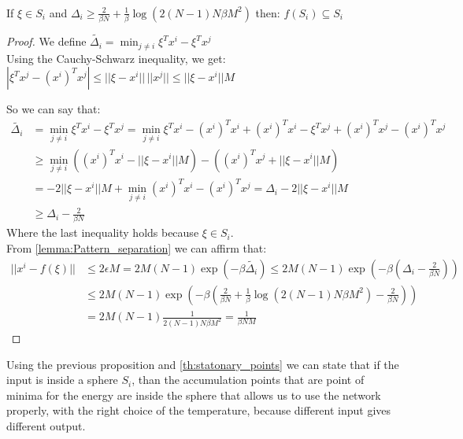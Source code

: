 \begin{proposition}\\
	\label{prop:local_conv}
	If $\xi \in S_i$ and $\Delta_i \geq \frac{2}{\beta N} + \frac{1}{\beta} \log(2(N-1)N \beta M^2)$ then: $f(S_i) \subseteq S_i$
	\begin{proof}
		We define $\widetilde{\Delta_i}= \min_{j\neq i} \xi^Tx^i - \xi^T x^j$\\
		Using the  Cauchy-Schwarz inequality, we get: $|\xi^Tx^j - (x^i)^Tx^j| \leq ||\xi - x^i||\, ||x^j|| \leq ||\xi - x^i|| M$

		\noindent So we can say that:
		\begin{align*}
			\widetilde{\Delta_i} &= \min_{j\neq i} \xi^Tx^i - \xi^T x^j =  \min_{j\neq i} \xi^Tx^i -(x^i)^Tx^i + (x^i)^Tx^i  -\xi^Tx^j + (x^i)^Tx^j - (x^i)^Tx^j \\
			&\geq \min_{j\neq i} ((x^i)^Tx^i - ||\xi - x^i|| M) - ((x^i)^Tx^j +||\xi - x^i|| M) \\
			&= -2||\xi -x^i||M +  \min_{j\neq i} (x^i)^Tx^i - (x^i)^Tx^j = \Delta_i - 2||\xi -x^i||M  \\
			& \geq \Delta_i - \frac{2}{\beta N}
		\end{align*}
		Where the last inequality holds because  $\xi \in S_i$.\\
		From \cref{lemma:Pattern_separation} we can affirm that:
		\begin{align*}
			||x^i - f(\xi)|| &\leq 2 \epsilon M = 2 M (N-1) \exp(-\beta \widetilde{\Delta_i}) \leq  2 M (N-1) \exp(-\beta (\Delta_i - \frac{2}{\beta N})) \\
			&\leq 2 M (N-1) \exp(-\beta ( \frac{2}{\beta N} + \frac{1}{\beta} \log(2(N-1)N \beta M^2) - \frac{2}{\beta N}))\\
			&=  2 M (N-1) \frac{1}{2(N-1)N \beta M^2} = \frac{1}{\beta N  M}
		\end{align*}
	\end{proof}
\end{proposition}
Using the previous proposition and \cref{th:statonary_points} we can state that if the input is inside a sphere $S_i$, than the accumulation points that are point of minima for the energy are inside the sphere that allows us to use the network properly, with the right choice of the temperature,  because different input gives different output.
